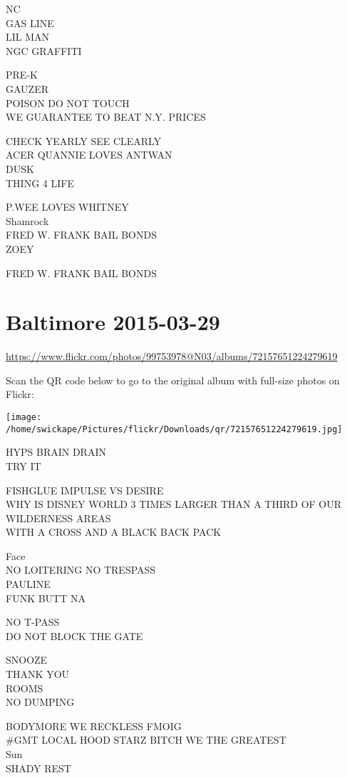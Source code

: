 \documentclass[10pt,letterpaper]{article}
\begin{document}
NC\\
GAS LINE\\
LIL MAN\\
NGC GRAFFITI

PRE{-}K\\
GAUZER\\
POISON DO NOT TOUCH\\
WE GUARANTEE TO BEAT N.Y. PRICES

CHECK YEARLY SEE CLEARLY\\
ACER QUANNIE LOVES ANTWAN\\
DUSK\\
THING 4 LIFE

P.WEE LOVES WHITNEY\\
Shamrock\\
FRED W. FRANK BAIL BONDS\\
ZOEY

FRED W. FRANK BAIL BONDS


\section*{Baltimore 2015-03-29}

\url{https://www.flickr.com/photos/99753978@N03/albums/72157651224279619}

Scan the QR code below to go to the original album with full-size photos on Flickr:

\texttt{[image: /home/swickape/Pictures/flickr/Downloads/qr/72157651224279619.jpg]}


HYPS BRAIN DRAIN\\
TRY IT

FISHGLUE IMPULSE VS DESIRE\\
WHY IS DISNEY WORLD 3 TIMES LARGER THAN A THIRD OF OUR WILDERNESS AREAS\\
WITH A CROSS AND A BLACK BACK PACK

Face\\
NO LOITERING NO TRESPASS\\
PAULINE\\
FUNK BUTT NA

NO T{-}PASS\\
DO NOT BLOCK THE GATE

SNOOZE\\
THANK YOU\\
ROOMS\\
NO DUMPING

BODYMORE WE RECKLESS FMOIG\\
\#GMT LOCAL HOOD STARZ BITCH WE THE GREATEST\\
Sun\\
SHADY REST
\end{document}
